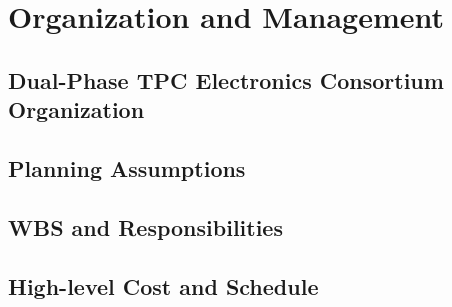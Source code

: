 


\section{Organization and Management}
\label{sec:fddp-tpc-elec-org}

\subsection{Dual-Phase TPC Electronics Consortium Organization}
\label{sec:fddp-tpc-elec-org-consortium}


\subsection{Planning Assumptions}
\label{sec:fddp-tpc-elec-org-assmp}


\subsection{WBS and Responsibilities}
\label{sec:fddp-tpc-elec-org-wbs}

\subsection{High-level Cost and Schedule}
\label{sec:fddp-tpc-elec-org-cs}














